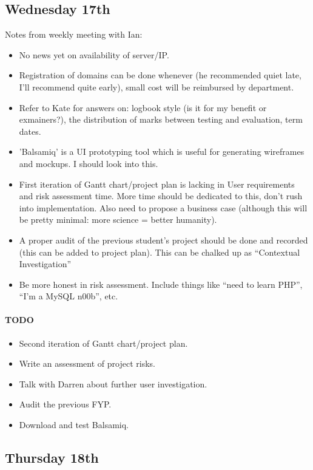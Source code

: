 \subsection{Wednesday 17th}
Notes from weekly meeting with Ian:

\begin{itemize}
\item No news yet on availability of server/IP.
\item Registration of domains can be done whenever (he recommended quiet late,
  I'll recommend quite early), small cost will be reimbursed by department.
\item Refer to Kate for answers on: logbook style (is it for my benefit or
  exmainers?), the distribution of marks between testing and evaluation, term
  dates.
\item 'Balsamiq' is a UI prototyping tool which is useful for generating
  wireframes and mockups. I should look into this.
\item First iteration of Gantt chart/project plan is lacking in User
  requirements and risk assessment time. More time should be dedicated to this,
  don't rush into implementation. Also need to propose a business case (although
  this will be pretty minimal: more science = better humanity).
\item A proper audit of the previous student's project should be done and
  recorded (this can be added to project plan). This can be chalked up as
  ``Contextual Investigation''
\item Be more honest in risk assessment. Include things like ``need to learn
  PHP'', ``I'm a MySQL n00b'', etc.
\end{itemize}

\paragraph{TODO}
\begin{itemize}
\item Second iteration of Gantt chart/project plan.
\item Write an assessment of project risks.
\item Talk with Darren about further user investigation.
\item Audit the previous FYP.
\item Download and test Balsamiq.
\end{itemize}

\subsection{Thursday 18th}
